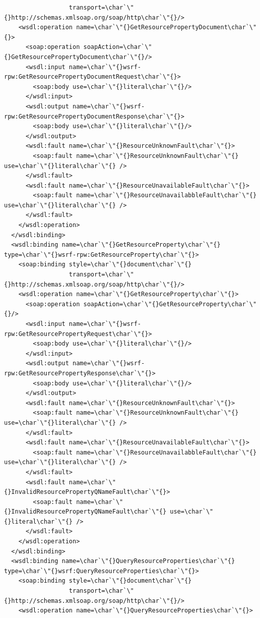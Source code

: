\documentclass{article}                            %
\begin{document}
\begin{footnotesize}
\begin{verbatim}
                  transport=\char`\"{}http://schemas.xmlsoap.org/soap/http\char`\"{}/>
    <wsdl:operation name=\char`\"{}GetResourcePropertyDocument\char`\"{}>
      <soap:operation soapAction=\char`\"{}GetResourcePropertyDocument\char`\"{}/>
      <wsdl:input name=\char`\"{}wsrf-rpw:GetResourcePropertyDocumentRequest\char`\"{}>
        <soap:body use=\char`\"{}literal\char`\"{}/>
      </wsdl:input>
      <wsdl:output name=\char`\"{}wsrf-rpw:GetResourcePropertyDocumentResponse\char`\"{}>
        <soap:body use=\char`\"{}literal\char`\"{}/>
      </wsdl:output>
      <wsdl:fault name=\char`\"{}ResourceUnknownFault\char`\"{}>
        <soap:fault name=\char`\"{}ResourceUnknownFault\char`\"{} use=\char`\"{}literal\char`\"{} />
      </wsdl:fault>
      <wsdl:fault name=\char`\"{}ResourceUnavailableFault\char`\"{}>
        <soap:fault name=\char`\"{}ResourceUnavailabbleFault\char`\"{} use=\char`\"{}literal\char`\"{} />
      </wsdl:fault>
    </wsdl:operation>
  </wsdl:binding>
  <wsdl:binding name=\char`\"{}GetResourceProperty\char`\"{} type=\char`\"{}wsrf-rpw:GetResourceProperty\char`\"{}>
    <soap:binding style=\char`\"{}document\char`\"{}
                  transport=\char`\"{}http://schemas.xmlsoap.org/soap/http\char`\"{}/>
    <wsdl:operation name=\char`\"{}GetResourceProperty\char`\"{}>
      <soap:operation soapAction=\char`\"{}GetResourceProperty\char`\"{}/>
      <wsdl:input name=\char`\"{}wsrf-rpw:GetResourcePropertyRequest\char`\"{}>
        <soap:body use=\char`\"{}literal\char`\"{}/>
      </wsdl:input>
      <wsdl:output name=\char`\"{}wsrf-rpw:GetResourcePropertyResponse\char`\"{}>
        <soap:body use=\char`\"{}literal\char`\"{}/>
      </wsdl:output>
      <wsdl:fault name=\char`\"{}ResourceUnknownFault\char`\"{}>
        <soap:fault name=\char`\"{}ResourceUnknownFault\char`\"{} use=\char`\"{}literal\char`\"{} />
      </wsdl:fault>
      <wsdl:fault name=\char`\"{}ResourceUnavailableFault\char`\"{}>
        <soap:fault name=\char`\"{}ResourceUnavailabbleFault\char`\"{} use=\char`\"{}literal\char`\"{} />
      </wsdl:fault>
      <wsdl:fault name=\char`\"{}InvalidResourcePropertyQNameFault\char`\"{}>
        <soap:fault name=\char`\"{}InvalidResourcePropertyQNameFault\char`\"{} use=\char`\"{}literal\char`\"{} />
      </wsdl:fault>
    </wsdl:operation>
  </wsdl:binding>
  <wsdl:binding name=\char`\"{}QueryResourceProperties\char`\"{} type=\char`\"{}wsrf:QueryResourceProperties\char`\"{}>
    <soap:binding style=\char`\"{}document\char`\"{}
                  transport=\char`\"{}http://schemas.xmlsoap.org/soap/http\char`\"{}/>
    <wsdl:operation name=\char`\"{}QueryResourceProperties\char`\"{}>

\end{verbatim}
\end{footnotesize}
\end{document}
